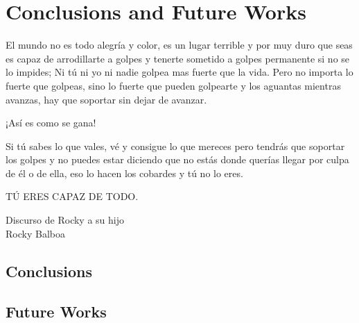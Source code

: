 % 
% 
% 
% 
% 
% 
% 

\chapter{Conclusions and Future Works}
\label{cha:conclusions_and_future_works}

\begin{FraseCelebre}
	\begin{Frase}
		El mundo no es todo alegría y color, es un lugar terrible y por muy duro que seas es capaz de arrodillarte a golpes y tenerte sometido a golpes permanente si no se lo impides; Ni tú ni yo ni nadie golpea mas fuerte que la vida. Pero no importa lo fuerte que golpeas, sino lo fuerte que pueden golpearte y los aguantas mientras avanzas, hay que soportar sin dejar de avanzar.
		
		¡Así es como se gana!
		
		Si tú sabes lo que vales, vé y consigue lo que mereces pero tendrás que soportar los golpes y no puedes estar diciendo que no estás donde querías llegar por culpa de él o de ella, eso lo hacen los cobardes y tú no lo eres.
		
		TÚ ERES CAPAZ DE TODO.
	\end{Frase}
	\begin{Fuente}
		Discurso de Rocky a su hijo \\
		Rocky Balboa
	\end{Fuente}
\end{FraseCelebre}


\section{Conclusions}
\label{sec:6_introduction}

\section{Future Works}
\label{sec:6_future_works}
